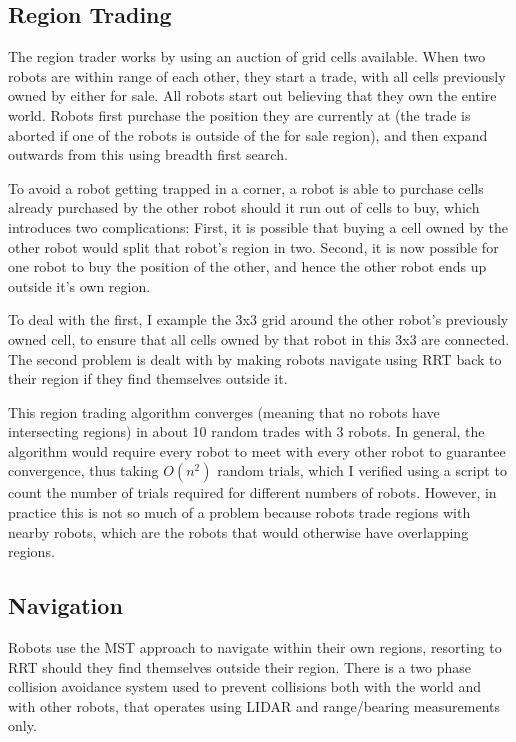 \documentclass[a4paper, 10pt, conference]{ieeeconf}      %
\begin{document}
\subsection{Region Trading}
The region trader works by using an auction of grid cells available. When two robots are within range of each other, they start a trade, with all cells previously owned by either for sale. All robots start out believing that they own the entire world. Robots first purchase the position they are currently at (the trade is aborted if one of the robots is outside of the for sale region), and then expand outwards from this using breadth first search.

To avoid a robot getting trapped in a corner, a robot is able to purchase cells already purchased by the other robot should it run out of cells to buy, which introduces two complications: First, it is possible that buying a cell owned by the other robot would split that robot's region in two. Second, it is now possible for one robot to buy the position of the other, and hence the other robot ends up outside it's own region.

To deal with the first, I example the 3x3 grid around the other robot's previously owned cell, to ensure that all cells owned by that robot in this 3x3 are connected. The second problem is dealt with by making robots navigate using RRT back to their region if they find themselves outside it.

This region trading algorithm converges (meaning that no robots have intersecting regions) in about 10 random trades with 3 robots. In general, the algorithm would require every robot to meet with every other robot to guarantee convergence, thus taking $O(n^2)$ random trials, which I verified using a script to count the number of trials required for different numbers of robots. However, in practice this is not so much of a problem because robots trade regions with nearby robots, which are the robots that would otherwise have overlapping regions.

\subsection{Navigation}
Robots use the MST approach to navigate within their own regions, resorting to RRT should they find themselves outside their region. There is a two phase collision avoidance system used to prevent collisions both with the world and with other robots, that operates using LIDAR and range/bearing measurements only.
\end{document}
